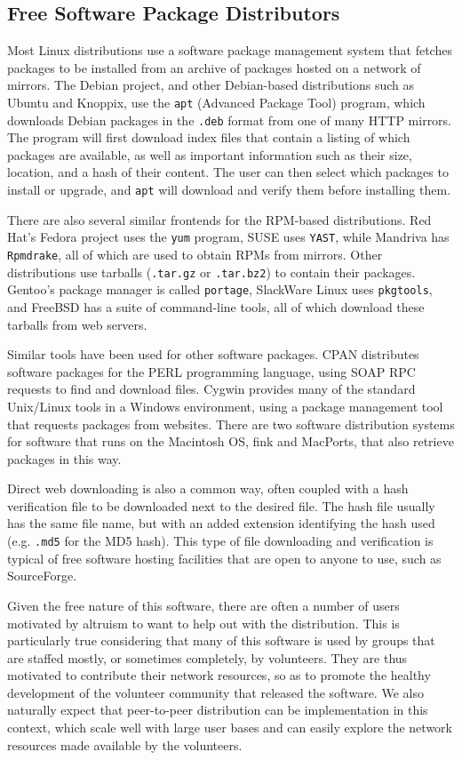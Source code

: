 \documentclass[conference]{IEEEtran}
\begin{document}
\subsection{Free Software Package Distributors}
\label{examples}

Most Linux distributions use a software package management system
that fetches packages to be installed from an archive of packages
hosted on a network of mirrors. The Debian project, and other
Debian-based distributions such as Ubuntu and Knoppix, use the
\texttt{apt} (Advanced Package Tool) program, which downloads Debian
packages in the \texttt{.deb} format from one of many HTTP mirrors.
The program will first download index files that contain a listing
of which packages are available, as well as important information
such as their size, location, and a hash of their content. The user
can then select which packages to install or upgrade, and
\texttt{apt} will download and verify them before installing them.

There are also several similar frontends for the RPM-based
distributions. Red Hat's Fedora project uses the \texttt{yum}
program, SUSE uses \texttt{YAST}, while Mandriva has
\texttt{Rpmdrake}, all of which are used to obtain RPMs from
mirrors. Other distributions use tarballs (\texttt{.tar.gz} or
\texttt{.tar.bz2}) to contain their packages. Gentoo's package
manager is called \texttt{portage}, SlackWare Linux uses
\texttt{pkgtools}, and FreeBSD has a suite of command-line tools,
all of which download these tarballs from web servers.

Similar tools have been used for other software packages. CPAN
distributes software packages for the PERL
programming language, using SOAP RPC requests to find and download
files. Cygwin provides many of the
standard Unix/Linux tools in a Windows environment, using a
package management tool that requests packages from websites. There
are two software distribution systems for software that runs on the Macintosh OS, fink and
MacPorts, that also retrieve packages in this way.

Direct web downloading is also a common way, often coupled with a hash
verification file to be downloaded next to the desired
file. The hash file usually has the same file name, but with an
added extension identifying the hash used (e.g. \texttt{.md5} for
the MD5 hash). This type of file downloading and verification is
typical of free software hosting facilities that are open to anyone
to use, such as SourceForge.


Given the free nature of this software, there are often a number of users 
motivated by altruism to want to help out with the distribution.
This is particularly true considering that many of this software is used by
groups that are staffed mostly, or sometimes completely, by
volunteers. They are thus motivated to contribute their network resources, so as to promote the healthy development 
of the volunteer community that released the software.
We also naturally expect that peer-to-peer distribution can be implementation in 
this context, which scale well with large user bases and can easily explore the network resources made available by
the volunteers. 
\end{document}
